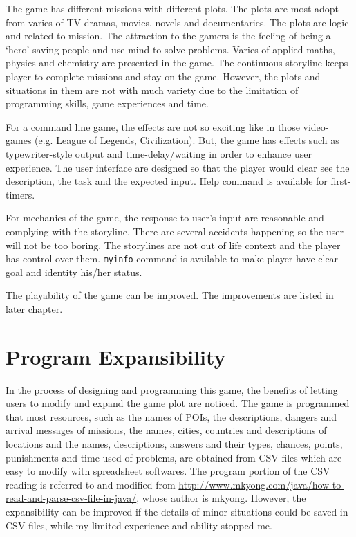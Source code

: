 \documentclass[letterpaper, 12pt]{report}
\begin{document}
The game has different missions with different plots. The plots are most adopt from varies of TV dramas, movies, novels and documentaries. The plots are logic and related to mission. The attraction to the gamers is the feeling of being a `hero' saving people and use mind to solve problems. Varies of applied maths, physics and chemistry are presented in the game. The continuous storyline keeps player to complete missions and stay on the game. However, the plots and situations in them are not with much variety due to the limitation of programming skills, game experiences and time.

For a command line game, the effects are not so exciting like in those video-games (e.g. League of Legends, Civilization). But, the game has effects such as typewriter-style output and time-delay/waiting in order to enhance user experience. The user interface are designed so that the player would clear see the description, the task and the expected input. Help command is available for first-timers.

For mechanics of the game, the response to user's input are reasonable and complying with the storyline. There are several accidents happening so the user will not be too boring. The storylines are not out of life context and the player has control over them. \texttt{myinfo} command is available to make player have clear goal and identity his/her status.

The playability of the game can be improved. The improvements are listed in later chapter.

\chapter{Program Expansibility}
In the process of designing and programming this game, the benefits of letting users to modify and expand the game plot are noticed. The game is programmed that most resources, such as the names of POIs, the descriptions, dangers and arrival messages of missions, the names, cities, countries and descriptions of locations and the names, descriptions, answers and their types, chances, points, punishments and time used of problems, are obtained from CSV files which are easy to modify with spreadsheet softwares. The program portion of the CSV reading is referred to and modified from \url{http://www.mkyong.com/java/how-to-read-and-parse-csv-file-in-java/}, whose author is mkyong. However, the expansibility can be improved if the details of minor situations could be saved in CSV files, while my limited experience and ability stopped me.
\end{document}
